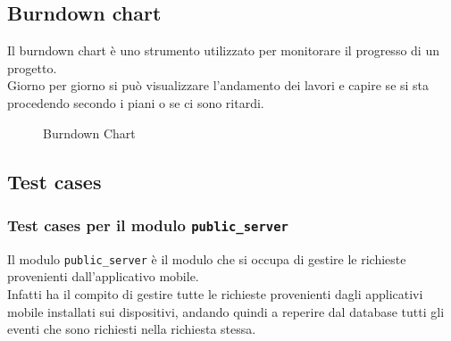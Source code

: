 \documentclass{article}
\begin{document}
\subsection{Burndown chart}
Il burndown chart è uno strumento utilizzato per monitorare il progresso di un progetto.\\
Giorno per giorno si può visualizzare l'andamento dei lavori e capire se si sta procedendo secondo i piani o se ci sono ritardi.\\

\begin{figure}[htbp]
    \centering
    \caption{Burndown Chart}
    \label{fig:burndown}
\end{figure}

\clearpage

\subsection{Test cases}
\subsubsection{Test cases per il modulo \texttt{public\_server}}
Il modulo \texttt{public\_server} è il modulo che si occupa di gestire le richieste provenienti dall'applicativo mobile.\\
Infatti ha il compito di gestire tutte le richieste provenienti dagli applicativi mobile installati sui dispositivi, andando quindi a reperire dal database tutti gli eventi che sono richiesti nella richiesta stessa.\\
\end{document}
